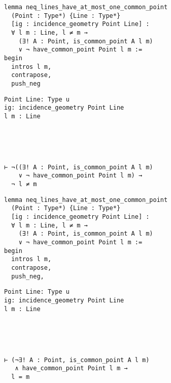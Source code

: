\begin{frame}[fragile]
	\begin{multicols}{2}
		\begin{lstlisting}
lemma neq_lines_have_at_most_one_common_point 
  (Point : Type*) {Line : Type*} 
  [ig : incidence_geometry Point Line] :
  ∀ l m : Line, l ≠ m → 
    (∃! A : Point, is_common_point A l m) 
    ∨ ¬ have_common_point Point l m := 
begin
  intros l m,
  contrapose,
  push_neg
\end{lstlisting}
		\columnbreak
		\begin{lstlisting}
Point Line: Type u
ig: incidence_geometry Point Line
l m : Line





⊢ ¬((∃! A : Point, is_common_point A l m) 
    ∨ ¬ have_common_point Point l m) → 
  ¬ l ≠ m
		\end{lstlisting}
	\end{multicols}
\end{frame}










\begin{frame}[fragile]
	\begin{multicols}{2}
		\begin{lstlisting}
lemma neq_lines_have_at_most_one_common_point 
  (Point : Type*) {Line : Type*} 
  [ig : incidence_geometry Point Line] :
  ∀ l m : Line, l ≠ m → 
    (∃! A : Point, is_common_point A l m) 
    ∨ ¬ have_common_point Point l m := 
begin
  intros l m,
  contrapose,
  push_neg,
\end{lstlisting}
		\columnbreak
		\begin{lstlisting}
Point Line: Type u
ig: incidence_geometry Point Line
l m : Line





⊢ (¬∃! A : Point, is_common_point A l m) 
   ∧ have_common_point Point l m → 
  l = m
		\end{lstlisting}
	\end{multicols}
\end{frame}










